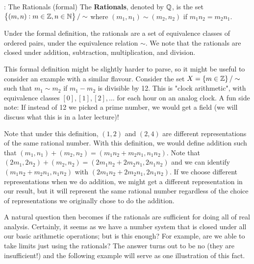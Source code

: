 \begin{ndef}{: The Rationals (formal)}
    The \textbf{Rationals}, denoted by $\mathbb{Q}$, is the set $\set{(m, n): m \in \mathbb{Z}, n \in \mathbb{N}}/\sim$ where $(m_1, n_1) \sim (m_2, n_2)$ if $m_1n_2 = m_2n_1$.
\end{ndef}
\noindent Under the formal definition, the rationals are a set of equivalence classes of ordered pairs, under the equivalence relation $\sim$. We note that the rationals are closed under addition, subtraction, multiplication, and division.

This formal definition might be slightly harder to parse, so it might be useful to consider an example with a similar flavour. Consider the set $X = \set{m \in \mathbb{Z}}/\sim$ such that $m_1 \sim m_2$ if $m_1 - m_2$ is divisible by 12. This is "clock arithmetic", with equivalence classes $[0], [1], [2], \ldots$ for each hour on an analog clock. A fun side note: If instead of 12 we picked a prime number, we would get a field (we will discuss what this is in a later lecture)!

Note that under this definition, $(1, 2)$ and $(2, 4)$ are different representations of the same rational number. With this definition, we would define addition such that $(m_1, n_1) + (m_2, n_2) = (m_1n_2 + m_2n_1, n_1n_2)$. Note that $(2m_1, 2n_2) + (m_2, n_2) = (2m_1n_2 + 2m_2n_1, 2n_1n_2)$ and we can identify $(m_1n_2 + m_2n_1, n_1n_2)$ with $(2m_1n_2 + 2m_2n_1, 2n_1n_2)$. If we choose different representations when we do addition, we might get a different representation in our result, but it will represent the same rational number regardless of the choice of representations we originally chose to do the addition. 

A natural question then becomes if the rationals are sufficient for doing all of real analysis. Certainly, it seems as we have a number system that is closed under all our basic arithmetic operations; but is this enough? For example, are we able to take limits just using the rationals? The answer turns out to be no (they are insufficient!) and the following example will serve as one illustration of this fact. 

